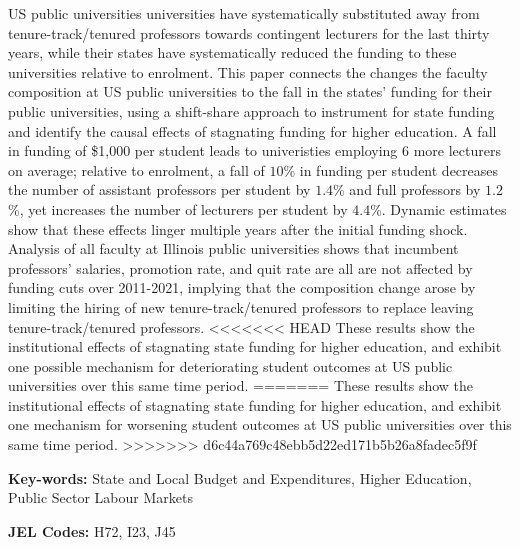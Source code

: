 US public universities universities have systematically substituted away from tenure-track/tenured professors towards contingent lecturers for the last thirty years, while their states have systematically reduced the funding to these universities relative to enrolment.
This paper connects the changes the faculty composition at US public universities to the fall in the states' funding for their public universities, using a shift-share approach to instrument for state funding and identify the causal effects of stagnating funding for higher education.
A fall in funding of \$1,000 per student leads to univeristies employing 6 more lecturers on average; relative to enrolment, a fall of $10$\% in funding per student decreases the number of assistant professors per student by $1.4$\% and full professors by $1.2$\%, yet increases the number of lecturers per student by $4.4$\%.
Dynamic estimates show that these effects linger multiple years after the initial funding shock.
Analysis of all faculty at Illinois public universities shows that incumbent professors' salaries, promotion rate, and quit rate are all are not affected by funding cuts over 2011-2021, implying that the composition change arose by limiting the hiring of new tenure-track/tenured professors to replace leaving tenure-track/tenured professors.
<<<<<<< HEAD
These results show the institutional effects of stagnating state funding for higher education, and exhibit one possible mechanism for deteriorating student outcomes at US public universities over this same time period.
=======
These results show the institutional effects of stagnating state funding for higher education, and exhibit one mechanism for worsening student outcomes at US public universities over this same time period.
>>>>>>> d6c44a769c48ebb5d22ed171b5b26a8fadec5f9f

\vfill
\noindent
\textbf{Key-words:}
State and Local Budget and Expenditures,
Higher Education,
Public Sector Labour Markets

\vspace{0.1cm}
\noindent
\textbf{JEL Codes:} H72, I23, J45
